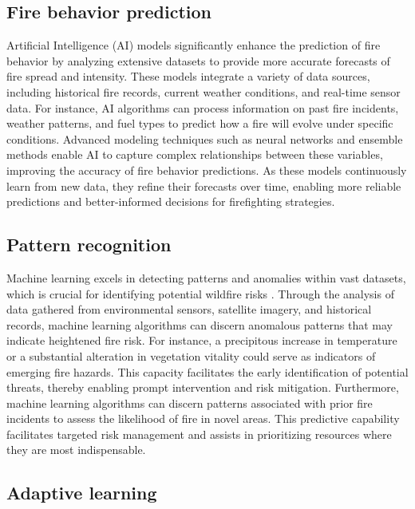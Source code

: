 \documentclass[
  12 pt,
]{Nemilov}
\begin{document}
\subsection{Fire behavior prediction}\label{fire-behavior-prediction}

Artificial Intelligence (AI) models significantly enhance the prediction of fire behavior by analyzing extensive datasets to provide more accurate forecasts of fire spread and intensity. These models integrate a variety of data sources, including historical fire records, current weather conditions, and real-time sensor data. For instance, AI algorithms can process information on past fire incidents, weather patterns, and fuel types to predict how a fire will evolve under specific conditions. Advanced modeling techniques such as neural networks and ensemble methods enable AI to capture complex relationships between these variables, improving the accuracy of fire behavior predictions. As these models continuously learn from new data, they refine their forecasts over time, enabling more reliable predictions and better-informed decisions for firefighting strategies.

\subsection{Pattern recognition}\label{pattern-recognition}

Machine learning excels in detecting patterns and anomalies within vast datasets, which is crucial for identifying potential wildfire risks \citep{oliveira2021wildfire, pais2021deep}. Through the analysis of data gathered from environmental sensors, satellite imagery, and historical records, machine learning algorithms can discern anomalous patterns that may indicate heightened fire risk. For instance, a precipitous increase in temperature or a substantial alteration in vegetation vitality could serve as indicators of emerging fire hazards. This capacity facilitates the early identification of potential threats, thereby enabling prompt intervention and risk mitigation. Furthermore, machine learning algorithms can discern patterns associated with prior fire incidents to assess the likelihood of fire in novel areas. This predictive capability facilitates targeted risk management and assists in prioritizing resources where they are most indispensable.

\subsection{Adaptive learning}\label{adaptive-learning}
\end{document}
